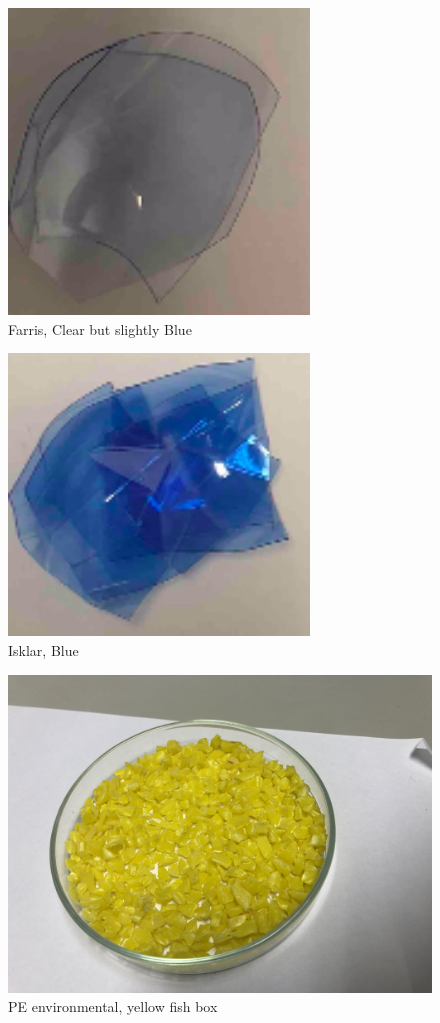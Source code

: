 \begin{appendices}
\begin{figure}
    \centering
    \includegraphics[width = 8cm]{Images/appendix/farris.png}
    \caption{Farris, Clear but slightly Blue}
    \label{fig:my_label}
\end{figure}

\begin{figure}
    \centering
    \includegraphics[width = 8cm]{Images/appendix/isklar.png}
    \caption{Isklar, Blue}
    \label{fig:isklar}
\end{figure}

\begin{figure}
    \centering
    \includegraphics[width = 12cm]{Images/appendix/PE-Yellow-Fish-Box-Beached-Texel.jpg}
    \caption{PE environmental, yellow fish box}
    \label{fig:pe_env}
\end{figure}



\end{appendices}
